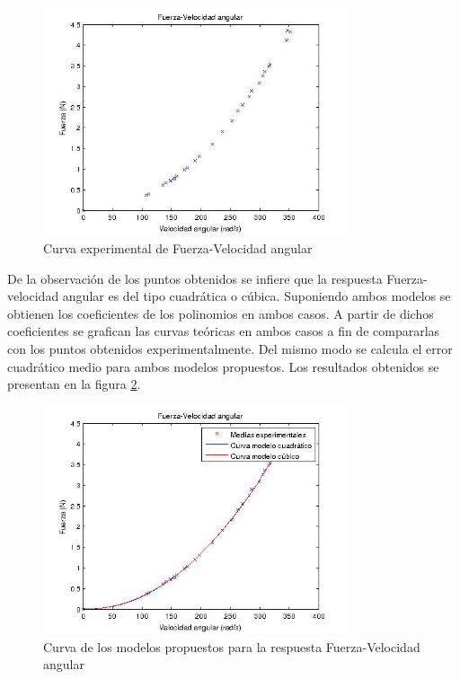 \documentclass[spanish,12pt,a4paper,titlepage]{report}
\begin{document}
\begin{figure}
  \vspace{-20pt}
  \begin{center}
    \includegraphics[width=0.8\textwidth]{./Pics/puntosfvel.jpg}
  \end{center}
  \vspace{-20pt}
  \caption{Curva experimental de Fuerza-Velocidad angular}
  \label{fig:grafica1}
  \vspace{-10pt}
\end{figure}


De la observación de los puntos obtenidos se infiere que la respuesta Fuerza-velocidad angular es del tipo cuadrática o cúbica. Suponiendo ambos modelos se obtienen los coeficientes de los polinomios en ambos casos. A partir de dichos coeficientes se grafican las curvas teóricas en ambos casos a fin de compararlas con los puntos obtenidos experimentalmente. Del mismo modo se calcula el error cuadrático medio para ambos modelos propuestos. Los resultados obtenidos se presentan en la figura \ref{fig:grafica2}.


\begin{figure}
  \vspace{-20pt}
  \begin{center}
    \includegraphics[width=0.8\textwidth]{./Pics/modsfvel.jpg}
  \end{center}
  \vspace{-20pt}
  \caption{Curva de los modelos propuestos para la respuesta Fuerza-Velocidad angular}
  \label{fig:grafica2}
  \vspace{-10pt}
\end{figure}
\end{document}

